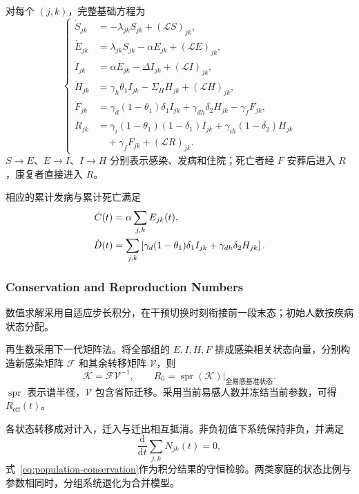 对每个 $(j,k)$，完整基础方程为
\begin{equation}
\left\{\begin{aligned}
\dot S_{jk}&=-\lambda_{jk}S_{jk}+(\mathcal{L}S)_{jk},\\
\dot E_{jk}&=\lambda_{jk}S_{jk}-\alpha E_{jk}+(\mathcal{L}E)_{jk},\\
\dot I_{jk}&=\alpha E_{jk}-\Delta I_{jk}+(\mathcal{L}I)_{jk},\\
\dot H_{jk}&=\gamma_h\theta_1I_{jk}-\Sigma_H H_{jk}+(\mathcal{L}H)_{jk},\\
\dot F_{jk}&=\gamma_d(1-\theta_1)\delta_1I_{jk}
             +\gamma_{dh}\delta_2H_{jk}-\gamma_fF_{jk},\\
\dot R_{jk}&=\gamma_i(1-\theta_1)(1-\delta_1)I_{jk}
             +\gamma_{ih}(1-\delta_2)H_{jk}\\
            &\quad+\gamma_fF_{jk}+(\mathcal{L}R)_{jk}.
\end{aligned}\right.
\label{eq:baseline-ode}
\end{equation}
$S\to E$、$E\to I$、$I\to H$ 分别表示感染、发病和住院；死亡者经 $F$ 安葬后进入 $R$，康复者直接进入 $R$。

相应的累计发病与累计死亡满足
\begin{align}
\dot C(t)&=\alpha\sum_{j,k}E_{jk}(t),\notag\\
\dot D(t)&=\sum_{j,k}\left[
\gamma_d(1-\theta_1)\delta_1I_{jk}
+\gamma_{dh}\delta_2H_{jk}\right].
\label{eq:cumulative-flows}
\end{align}
\subsubsection{Conservation and Reproduction Numbers}

数值求解采用自适应步长积分，在干预切换时刻衔接前一段末态；初始人数按疾病状态分配。

再生数采用下一代矩阵法\cite{diekmann1990,vandendriessche2002}。将全部组的 $E,I,H,F$ 排成感染相关状态向量，分别构造新感染矩阵 $\mathcal{F}$ 和其余转移矩阵 $\mathcal{V}$，则
\begin{equation}
\mathcal{K}=\mathcal{F}\mathcal{V}^{-1},\qquad
R_0=\operatorname{spr}(\mathcal{K})\big|_{\text{全易感基准状态}}.
\label{eq:next-generation}
\end{equation}
$\operatorname{spr}$ 表示谱半径，$\mathcal{V}$ 包含省际迁移。采用当前易感人数并冻结当前参数，可得 $R_{\mathrm{eff}}(t)$。

各状态转移成对计入，迁入与迁出相互抵消。非负初值下系统保持非负，并满足
\begin{equation}
\frac{\mathrm d}{\mathrm dt}\sum_{j,k}N_{jk}(t)=0,
\label{eq:population-conservation}
\end{equation}
式~\eqref{eq:population-conservation}作为积分结果的守恒检验。两类家庭的状态比例与参数相同时，分组系统退化为合并模型。
